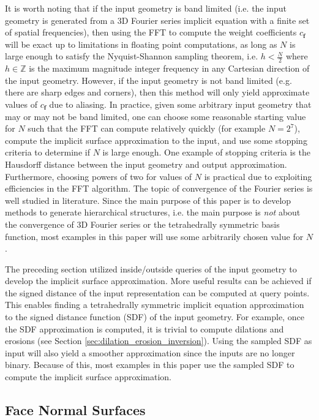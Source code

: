 \documentclass[acmtog]{acmart}
\begin{document}
It is worth noting that if the input geometry is band limited (i.e. the input geometry is generated from a 3D Fourier series implicit equation with a finite set of spatial frequencies), then using the FFT to compute the weight coefficients $c_{\mathbf{f}}$ will be exact up to limitations in floating point computations, as long as $N$ is large enough to satisfy the Nyquist-Shannon sampling theorem, i.e. $h < \frac{N}{2}$ where $h \in \mathbb{Z}$ is the maximum magnitude integer frequency in any Cartesian direction of the input geometry. However, if the input geometry is not band limited (e.g. there are sharp edges and corners), then this method will only yield approximate values of $c_{\mathbf{f}}$ due to aliasing. In practice, given some arbitrary input geometry that may or may not be band limited, one can choose some reasonable starting value for $N$ such that the FFT can compute relatively quickly (for example $N = 2^7$), compute the implicit surface approximation to the input, and use some stopping criteria to determine if $N$ is large enough. One example of stopping criteria is the Hausdorff distance between the input geometry and output approximation. Furthermore, choosing powers of two for values of $N$ is practical due to exploiting efficiencies in the FFT algorithm. The topic of convergence of the Fourier series is well studied in literature. Since the main purpose of this paper is to develop methods to generate hierarchical structures, i.e. the main purpose is \textit{not} about the convergence of 3D Fourier series or the tetrahedrally symmetric basis function, most examples in this paper will use some arbitrarily chosen value for $N$.

The preceding section utilized inside/outside queries of the input geometry to develop the implicit surface approximation. More useful results can be achieved if the signed distance of the input representation can be computed at query points. This enables finding a tetrahedrally symmetric implicit equation approximation to the signed distance function (SDF) of the input geometry. For example, once the SDF approximation is computed, it is trivial to compute dilations and erosions (see Section \ref{sec:dilation_erosion_inversion}). Using the sampled SDF as input will also yield a smoother approximation since the inputs are no longer binary. Because of this, most examples in this paper use the sampled SDF to compute the implicit surface approximation.

\subsection{Face Normal Surfaces}
\label{sec:face_normal_surfaces}
\end{document}
